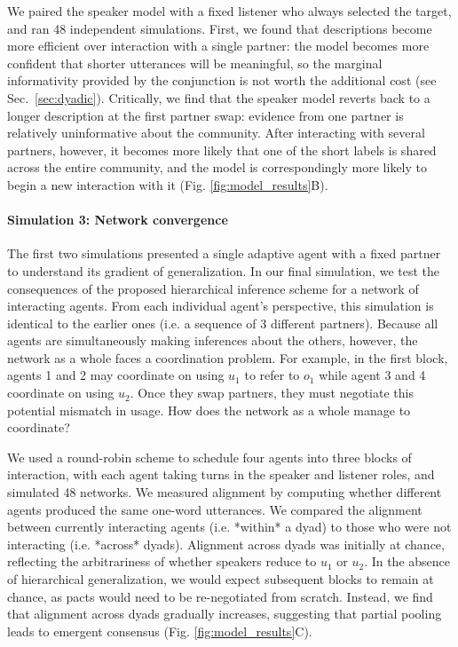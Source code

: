 We paired the speaker model with a fixed listener who always selected the target, and ran 48 independent simulations.
First, we found that descriptions become more efficient over interaction with a single partner: the model becomes more confident that shorter utterances will be meaningful, so the marginal informativity provided by the conjunction is not worth the additional cost (see Sec.~\ref{sec:dyadic}).
Critically, we find that the speaker model reverts back to a longer description at the first partner swap: evidence from one partner is relatively uninformative about the community.
After interacting with several partners, however, it becomes more likely that one of the short labels is shared across the entire community, and the model is correspondingly more likely to begin a new interaction with it (Fig. \ref{fig:model_results}B).

\paragraph{Simulation 3: Network convergence}

The first two simulations presented a single adaptive agent with a fixed partner to understand its gradient of generalization. 
In our final simulation, we test the consequences of the proposed hierarchical inference scheme for a network of interacting agents.
From each individual agent's perspective, this simulation is identical to the earlier ones (i.e. a sequence of 3 different partners).
Because all agents are simultaneously making inferences about the others, however, the network as a whole faces a coordination problem.
For example, in the first block, agents 1 and 2 may coordinate on using $u_1$ to refer to $o_1$ while agent 3 and 4 coordinate on using $u_2$. 
Once they swap partners, they must negotiate this potential mismatch in usage. 
How does the network as a whole manage to coordinate?

We used a round-robin scheme to schedule four agents into three blocks of interaction, with each agent taking turns in the speaker and listener roles, and simulated 48 networks.
We measured alignment by computing whether different agents produced the same one-word utterances. 
We compared the alignment between currently interacting agents (i.e. *within* a dyad) to those who were not interacting (i.e. *across* dyads).
Alignment across dyads was initially at chance, reflecting the arbitrariness of whether speakers reduce to $u_1$ or $u_2$. 
In the absence of hierarchical generalization, we would expect subsequent blocks to remain at chance, as pacts would need to be re-negotiated from scratch.
Instead, we find that alignment across dyads gradually increases, suggesting that partial pooling leads to emergent consensus (Fig. \ref{fig:model_results}C).

